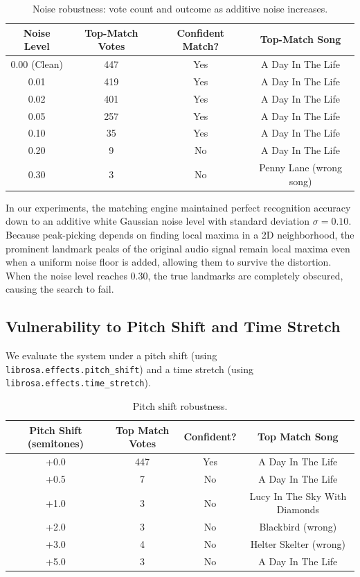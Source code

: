 \documentclass[11pt,a4paper]{article}
\begin{document}
\begin{table}[H]
\centering
\caption{Noise robustness: vote count and outcome as additive noise increases.}
\label{tab:noise_robustness}
\begin{tabular}{cccc}
\toprule
\textbf{Noise Level} & \textbf{Top-Match Votes} & \textbf{Confident Match?} & \textbf{Top-Match Song} \\
\midrule
0.00 (Clean) & 447 & Yes & A Day In The Life \\
0.01 & 419 & Yes & A Day In The Life \\
0.02 & 401 & Yes & A Day In The Life \\
0.05 & 257 & Yes & A Day In The Life \\
0.10 & 35  & Yes & A Day In The Life \\
0.20 & 9   & No  & A Day In The Life \\
0.30 & 3   & No  & Penny Lane (wrong song) \\
\bottomrule
\end{tabular}
\end{table}

In our experiments, the matching engine maintained perfect recognition accuracy down to an additive white Gaussian noise level with standard deviation $\sigma = 0.10$. Because peak-picking depends on finding local maxima in a 2D neighborhood, the prominent landmark peaks of the original audio signal remain local maxima even when a uniform noise floor is added, allowing them to survive the distortion. When the noise level reaches 0.30, the true landmarks are completely obscured, causing the search to fail.

\subsection{Vulnerability to Pitch Shift and Time Stretch}
We evaluate the system under a pitch shift (using \texttt{librosa.effects.pitch\_shift}) and a time stretch (using \texttt{librosa.effects.time\_stretch}).

\begin{table}[H]
\centering
\caption{Pitch shift robustness.}
\label{tab:pitch_shift}
\begin{tabular}{cccc}
\toprule
\textbf{Pitch Shift (semitones)} & \textbf{Top Match Votes} & \textbf{Confident?} & \textbf{Top Match Song} \\
\midrule
+0.0 & 447 & Yes & A Day In The Life \\
+0.5 & 7 & No & A Day In The Life \\
+1.0 & 3 & No & Lucy In The Sky With Diamonds \\
+2.0 & 3 & No & Blackbird (wrong) \\
+3.0 & 4 & No & Helter Skelter (wrong) \\
+5.0 & 3 & No & A Day In The Life \\
\bottomrule
\end{tabular}
\end{table}
\end{document}
